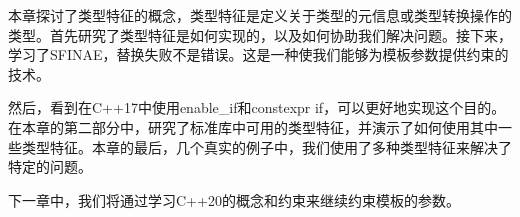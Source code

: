 本章探讨了类型特征的概念，类型特征是定义关于类型的元信息或类型转换操作的类型。首先研究了类型特征是如何实现的，以及如何协助我们解决问题。接下来，学习了SFINAE，替换失败不是错误。这是一种使我们能够为模板参数提供约束的技术。

然后，看到在C++17中使用enable\_if和constexpr if，可以更好地实现这个目的。在本章的第二部分中，研究了标准库中可用的类型特征，并演示了如何使用其中一些类型特征。本章的最后，几个真实的例子中，我们使用了多种类型特征来解决了特定的问题。

下一章中，我们将通过学习C++20的概念和约束来继续约束模板的参数。